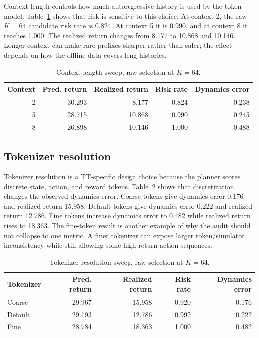 \documentclass{article}
\begin{document}
Context length controls how much autoregressive history is used by the token model. Table~\ref{tab:context} shows that risk is sensitive to this choice. At context 2, the raw \(K=64\) candidate risk rate is 0.824. At context 5 it is 0.990, and at context 8 it reaches 1.000. The realized return changes from 8.177 to 10.868 and 10.146. Longer context can make rare prefixes sharper rather than safer; the effect depends on how the offline data covers long histories.

\begin{table}[t]
\caption{Context-length sweep, raw selection at \(K=64\).}
\label{tab:context}
\begin{center}
\small
\begin{tabular}{rrrrr}
\toprule
Context & Pred. return & Realized return & Risk rate & Dynamics error \\
\midrule
2 & 30.293 & 8.177 & 0.824 & 0.238 \\
5 & 28.715 & 10.868 & 0.990 & 0.245 \\
8 & 26.898 & 10.146 & 1.000 & 0.488 \\
\bottomrule
\end{tabular}
\end{center}
\end{table}

\subsection{Tokenizer resolution}

Tokenizer resolution is a TT-specific design choice because the planner scores discrete state, action, and reward tokens. Table~\ref{tab:tokenizer} shows that discretization changes the observed dynamics error. Coarse tokens give dynamics error 0.176 and realized return 15.958. Default tokens give dynamics error 0.222 and realized return 12.786. Fine tokens increase dynamics error to 0.482 while realized return rises to 18.363. The fine-token result is another example of why the audit should not collapse to one metric. A finer tokenizer can expose larger token/simulator inconsistency while still allowing some high-return action sequences.

\begin{table}[t]
\caption{Tokenizer-resolution sweep, raw selection at \(K=64\).}
\label{tab:tokenizer}
\begin{center}
\small
\begin{tabular}{lrrrr}
\toprule
Tokenizer & Pred. return & Realized return & Risk rate & Dynamics error \\
\midrule
Coarse & 29.967 & 15.958 & 0.920 & 0.176 \\
Default & 29.193 & 12.786 & 0.992 & 0.222 \\
Fine & 28.784 & 18.363 & 1.000 & 0.482 \\
\bottomrule
\end{tabular}
\end{center}
\end{table}
\end{document}
